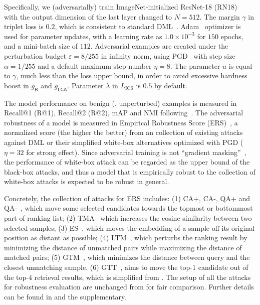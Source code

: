 \documentclass[10pt,twocolumn,letterpaper]{article}
\begin{document}



Specifically, we (adversarially) train ImageNet-initialized ResNet-18
(RN18)~\cite{resnet} with the output dimension of the last layer changed to
$N{=}512$.
%
The margin $\gamma$ in triplet loss is $0.2$, which is consistent to standard
DML~\cite{revisiting}.
%
Adam~\cite{adam} optimizer is used for parameter updates, with a learning rate
as $1.0{\times}10^{-3}$ for $150$ epochs, and a mini-batch size of $112$.
%
Adversarial examples are created under the perturbation budget
$\varepsilon{=}8/255$ in infinity norm, using PGD~\cite{madry} with step size
$\alpha{=}1/255$ and a default maximum step number $\eta{=}8$.
%
The parameter $u$ is equal to $\gamma$, much less than the loss upper bound,
in order to avoid excessive hardness boost in $g_\mathsf{B}$ and $g_\mathsf{LGA}$.
%
Parameter $\lambda$ in $L_\text{ICS}$ is $0.5$ by default.

The model performance on benign (\ie, unperturbed) examples is measured in
Recall@1 (R@1), Recall@2 (R@2), mAP and NMI
following~\cite{revisiting,robrank}.
%
The adversarial robustness of a model is measured in Empirical Robustness Score
(ERS)~\cite{robrank}, a normalized score (the higher the better) from
an collection of existing attacks against DML or their simplified white-box
alternatives optimized with PGD ($\eta=32$ for strong effect).
%
Since adversarial training is not ``gradient masking''~\cite{obfuscated}, the
performance of white-box attack can be regarded as the upper bound of the
black-box attacks, and thus a model that is empirically robust to the collection
of white-box attacks is expected to be robust in general.

Concretely, the collection of attacks for ERS includes:
%
(1) CA+, CA-, QA+ and QA-~\cite{advrank}, which move some selected candidates
towards the topmost or bottommost part of ranking list;
%
(2) TMA~\cite{flowertower} which increases the cosine similarity between two selected samples;
%
(3) ES~\cite{advrank,advdpqn}, which moves the embedding of a sample off its original position as
distant as possible;
%
(4) LTM~\cite{learn-to-misrank}, which perturbs the ranking result by minimizing the distance of
unmatched pairs while maximizing the distance of matched pairs;
%
(5) GTM~\cite{robrank}, which minimizes the distance between query and the
closest unmatching sample.
%
(6) GTT~\cite{robrank}, aims to move the top-$1$ candidate out of the top-$4$
retrieval results, which is simplified from \cite{qair}.
%
The setup of all the attacks for robustness evaluation are unchanged from
\cite{robrank} for fair comparison.
%
Further details can be found in \cite{robrank} and the supplementary.
\end{document}

